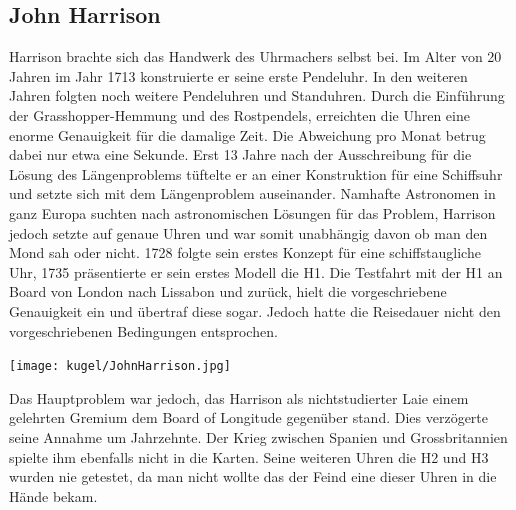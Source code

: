\begin{refsection}
\subsection{John Harrison}
Harrison brachte sich das Handwerk des Uhrmachers selbst bei. Im Alter von 20 Jahren im Jahr 1713 konstruierte er seine erste Pendeluhr. In den weiteren Jahren folgten noch weitere Pendeluhren und Standuhren. Durch die Einführung der Grasshopper-Hemmung und des Rostpendels, erreichten die Uhren eine enorme Genauigkeit für die damalige Zeit. Die Abweichung pro Monat betrug dabei nur etwa eine Sekunde.
Erst 13 Jahre nach der Ausschreibung für die Lösung des Längenproblems tüftelte er an einer Konstruktion für eine Schiffsuhr und setzte sich mit dem Längenproblem auseinander.
Namhafte Astronomen in ganz Europa suchten nach astronomischen Lösungen für das Problem, Harrison jedoch setzte auf genaue Uhren und war somit unabhängig davon ob man den Mond sah oder nicht.
1728 folgte sein erstes Konzept für eine schiffstaugliche Uhr, 1735 präsentierte er sein erstes Modell die H1. Die Testfahrt mit der H1 an Board von London nach Lissabon und zurück, hielt die vorgeschriebene Genauigkeit ein und übertraf diese sogar. Jedoch hatte die Reisedauer nicht den vorgeschriebenen Bedingungen entsprochen.
\begin{center}
        \texttt{[image: kugel/JohnHarrison.jpg]}
\end{center}
Das Hauptproblem war jedoch, das Harrison als nichtstudierter Laie einem gelehrten Gremium dem Board of Longitude gegenüber stand. Dies verzögerte seine Annahme um Jahrzehnte. Der Krieg zwischen Spanien und Grossbritannien spielte ihm ebenfalls nicht in die Karten. Seine weiteren Uhren die H2 und H3 wurden nie getestet, da man nicht wollte das der Feind eine dieser Uhren in die Hände bekam.


\end{refsection}
